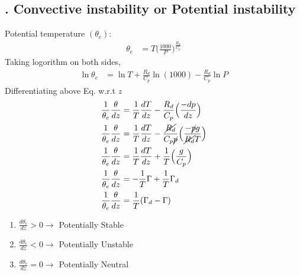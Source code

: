 \documentclass[fleqn,10pt]{SelfArx} %
\begin{document}
\newpage
\subsection{. Convective instability or Potential instability}
Potential temperature $(\theta_e)$:
\begin{align}
    \theta_e &= T\Big(\frac{1000}{P}\Big)^{\frac{R_d}{C_p}}
\end{align}
Taking logorithm on both sides,
\begin{align}
    \ln{\theta_e} &= \ln{T} + {\frac{R_d}{C_p}}\ln{(1000)} - {\frac{R_d}{C_p}}\ln{P}
\end{align}
Differentiating above Eq. w.r.t $z$
\begin{align}
    \frac{1}{\theta_e}\frac{\theta}{dz} &= \frac{1}{T}\frac{dT}{dz} - \frac{R_d}{C_p}\Big(\frac{-dp}{dz}\Big) \\
    \frac{1}{\theta_e}\frac{\theta}{dz} &= \frac{1}{T}\frac{dT}{dz} - \frac{\cancel{R_d}}{C_p \cancel{p}}\Big(\frac{-\cancel{p}g}{\cancel{R_d}T}\Big) \\
    \frac{1}{\theta_e}\frac{\theta}{dz} &= \frac{1}{T}\frac{dT}{dz} + \frac{1}{T}\Big(\frac{g}{C_p}\Big) \\
    \frac{1}{\theta_e}\frac{\theta}{dz} &= -\frac{1}{T}\Gamma + \frac{1}{T}\Gamma_d \\
    \frac{1}{\theta_e}\frac{\theta}{dz} &= \frac{1}{T}(\Gamma_d - \Gamma)
\end{align}

\begin{enumerate}[noitemsep]
    \item $\frac{d\theta_e}{dz} > 0 \rightarrow $ Potentially Stable
    \item $\frac{d\theta_e}{dz} < 0 \rightarrow $ Potentially Unstable
    \item $\frac{d\theta_e}{dz} = 0 \rightarrow $ Potentially Neutral
\end{enumerate}
\end{document}
